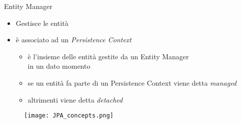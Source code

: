 \begin{frame}{Entity Manager}


\begin{itemize}
\item Gestisce le entità

\vspace{0.6em}

\item è associato ad un \textsl{Persistence Context}
	\begin{itemize}
	
	\vspace{0.3em}
	
	\item è l'insieme delle entità gestite da un Entity Manager \\
		in un dato momento
	
	\vspace{0.5em}
		
	\item se un entità fa parte di un Persistence Context viene detta \textsl{managed}
	
	\vspace{0.5em}
	
	\item altrimenti viene detta \textsl{detached}
	\end{itemize}
\end{itemize}

\begin{figure}
	\centering
	\texttt{[image: JPA\_concepts.png]}
\end{figure}


\end{frame}

